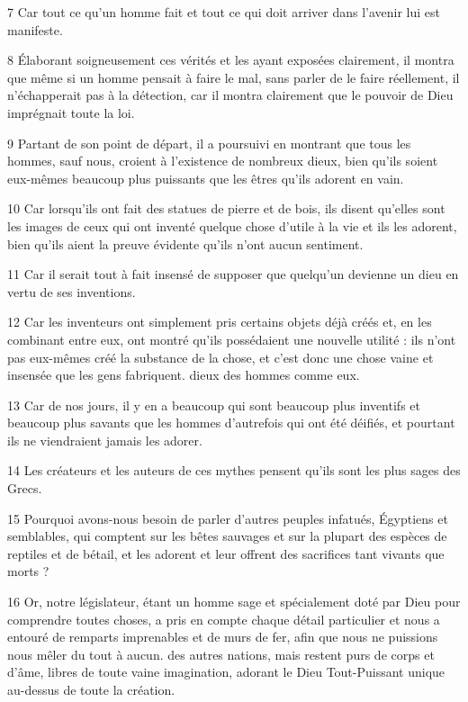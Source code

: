 \par 7 Car tout ce qu'un homme fait et tout ce qui doit arriver dans l'avenir lui est manifeste.

\par 8 Élaborant soigneusement ces vérités et les ayant exposées clairement, il montra que même si un homme pensait à faire le mal, sans parler de le faire réellement, il n'échapperait pas à la détection, car il montra clairement que le pouvoir de Dieu imprégnait toute la loi.

\par 9 Partant de son point de départ, il a poursuivi en montrant que tous les hommes, sauf nous, croient à l'existence de nombreux dieux, bien qu'ils soient eux-mêmes beaucoup plus puissants que les êtres qu'ils adorent en vain.

\par 10 Car lorsqu'ils ont fait des statues de pierre et de bois, ils disent qu'elles sont les images de ceux qui ont inventé quelque chose d'utile à la vie et ils les adorent, bien qu'ils aient la preuve évidente qu'ils n'ont aucun sentiment.

\par 11 Car il serait tout à fait insensé de supposer que quelqu'un devienne un dieu en vertu de ses inventions.

\par 12 Car les inventeurs ont simplement pris certains objets déjà créés et, en les combinant entre eux, ont montré qu'ils possédaient une nouvelle utilité : ils n'ont pas eux-mêmes créé la substance de la chose, et c'est donc une chose vaine et insensée que les gens fabriquent. dieux des hommes comme eux.

\par 13 Car de nos jours, il y en a beaucoup qui sont beaucoup plus inventifs et beaucoup plus savants que les hommes d'autrefois qui ont été déifiés, et pourtant ils ne viendraient jamais les adorer.

\par 14 Les créateurs et les auteurs de ces mythes pensent qu'ils sont les plus sages des Grecs.

\par 15 Pourquoi avons-nous besoin de parler d'autres peuples infatués, Égyptiens et semblables, qui comptent sur les bêtes sauvages et sur la plupart des espèces de reptiles et de bétail, et les adorent et leur offrent des sacrifices tant vivants que morts ?

\par 16 Or, notre législateur, étant un homme sage et spécialement doté par Dieu pour comprendre toutes choses, a pris en compte chaque détail particulier et nous a entouré de remparts imprenables et de murs de fer, afin que nous ne puissions nous mêler du tout à aucun. des autres nations, mais restent purs de corps et d'âme, libres de toute vaine imagination, adorant le Dieu Tout-Puissant unique au-dessus de toute la création.

